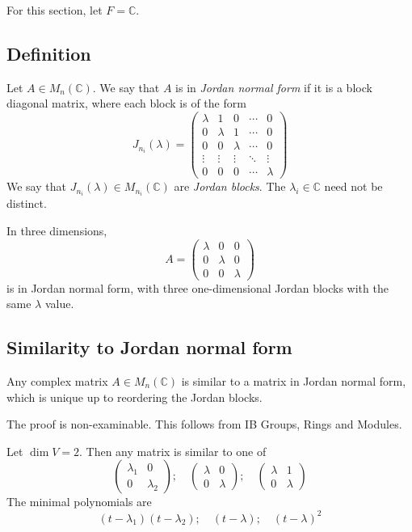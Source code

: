 For this section, let \( F = \mathbb C \).

\subsection{Definition}
\begin{definition}
	Let \( A \in M_n(\mathbb C) \).
	We say that \( A \) is in \textit{Jordan normal form} if it is a block diagonal matrix, where each block is of the form
	\[
		J_{n_i}(\lambda) =
		\begin{pmatrix}
			\lambda & 1       & 0       & \cdots & 0       \\
			0       & \lambda & 1       & \cdots & 0       \\
			0       & 0       & \lambda & \cdots & 0       \\
			\vdots  & \vdots  & \vdots  & \ddots & \vdots  \\
			0       & 0       & 0       & \cdots & \lambda
		\end{pmatrix}
	\]
	We say that \( J_{n_i}(\lambda) \in M_{n_i}(\mathbb C) \) are \textit{Jordan blocks}.
	The \( \lambda_i \in \mathbb C \) need not be distinct.
\end{definition}
\begin{remark}
	In three dimensions,
	\[
		A =
		\begin{pmatrix}
			\lambda & 0       & 0       \\
			0       & \lambda & 0       \\
			0       & 0       & \lambda
		\end{pmatrix}
	\]
	is in Jordan normal form, with three one-dimensional Jordan blocks with the same \( \lambda \) value.
\end{remark}

\subsection{Similarity to Jordan normal form}
\begin{theorem}
	Any complex matrix \( A \in M_n(\mathbb C) \) is similar to a matrix in Jordan normal form, which is unique up to reordering the Jordan blocks.
\end{theorem}
\noindent The proof is non-examinable.
This follows from IB Groups, Rings and Modules.
\begin{example}
	Let \( \dim V = 2 \).
	Then any matrix is similar to one of
	\[
		\begin{pmatrix}
			\lambda_1 & 0         \\
			0         & \lambda_2
		\end{pmatrix};\quad
		\begin{pmatrix}
			\lambda & 0       \\
			0       & \lambda
		\end{pmatrix};\quad
		\begin{pmatrix}
			\lambda & 1       \\
			0       & \lambda
		\end{pmatrix}
	\]
	The minimal polynomials are
	\[
		(t-\lambda_1)(t-\lambda_2);\quad (t-\lambda);\quad (t-\lambda)^2
	\]
\end{example}

